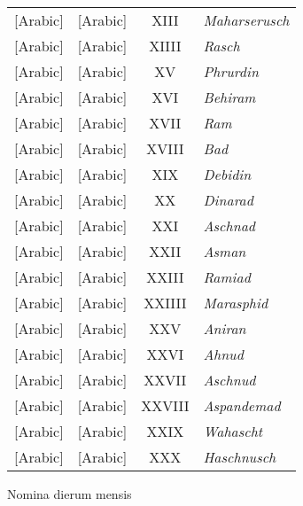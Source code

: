 \begin{tabnums}
\begin{tabular}{@{} r l c l @{}}
\textarabic{}[Arabic] & \textarabic{}[Arabic]
 &   XIII & \textit{Maharserusch} \\
\textarabic{}[Arabic] & \textarabic{}[Arabic]
 &  XIIII & \textit{Rasch} \\
\textarabic{}[Arabic] & \textarabic{}[Arabic]
 &     XV & \textit{Phrurdin} \\
\textarabic{}[Arabic] & \textarabic{}[Arabic]
 &    XVI & \textit{Behiram} \\
\textarabic{}[Arabic] & \textarabic{}[Arabic]
 &   XVII & \textit{Ram} \\
\textarabic{}[Arabic] & \textarabic{}[Arabic]
 &  XVIII & \textit{Bad} \\
\textarabic{}[Arabic] & \textarabic{}[Arabic]
 &    XIX & \textit{Debidin} \\
\textarabic{}[Arabic] & \textarabic{}[Arabic]
 &     XX & \textit{Dinarad} \\
\textarabic{}[Arabic] & \textarabic{}[Arabic]
 &    XXI & \textit{Aschnad} \\
\textarabic{}[Arabic] & \textarabic{}[Arabic]
 &   XXII & \textit{Asman} \\
\textarabic{}[Arabic] & \textarabic{}[Arabic]
 &  XXIII & \textit{Ramiad} \\
\textarabic{}[Arabic] & \textarabic{}[Arabic]
 & XXIIII & \textit{Marasphid} \\
\textarabic{}[Arabic] & \textarabic{}[Arabic]
 &    XXV & \textit{Aniran} \\
\textarabic{}[Arabic] & \textarabic{}[Arabic]
 &   XXVI & \textit{Ahnud} \\
\textarabic{}[Arabic] & \textarabic{}[Arabic]
 &  XXVII & \textit{Aschnud} \\
\textarabic{}[Arabic] & \textarabic{}[Arabic]
 & XXVIII & \textit{Aspandemad} \\
\textarabic{}[Arabic] & \textarabic{}[Arabic]
 &   XXIX & \textit{Wahascht} \\
\textarabic{}[Arabic] & \textarabic{}[Arabic]
 &    XXX & \textit{Haschnusch} \\
\bottomrule
\end{tabular}
%
\caption{Nomina dierum mensis}
\label{tab:p207}
%
\end{tabnums}
